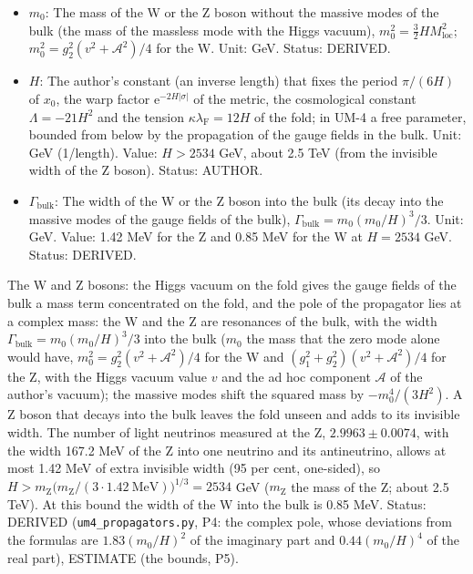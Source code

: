 \documentclass[
  10pt,
]{article}
\begin{document}
\begin{itemize}
  mass. Unit: GeV. Status: STANDARD.
\item
  \(m_0\): The mass of the W or the Z boson without the massive modes of
  the bulk (the mass of the massless mode with the Higgs vacuum),
  \(m_0^2 = \frac32HM_{\mathrm{loc}}^2\);
  \(m_0^2 = g_2^2(v^2 + \mathcal{A}^2)/4\) for the W. Unit: GeV. Status:
  DERIVED.
\item
  \(H\): The author's constant (an inverse length) that fixes the period
  \(\pi/(6H)\) of \(x_0\), the warp factor
  \(\mathrm{e}^{-2H\lvert\sigma\rvert}\) of the metric, the cosmological
  constant \(\Lambda = -21H^2\) and the tension
  \(\kappa\lambda_{\mathrm{F}} = 12H\) of the fold; in UM-4 a free
  parameter, bounded from below by the propagation of the gauge fields
  in the bulk. Unit: GeV (1/length). Value: \(H > 2534\) GeV, about 2.5
  TeV (from the invisible width of the Z boson). Status: AUTHOR.
\item
  \(\Gamma_{\mathrm{bulk}}\): The width of the W or the Z boson into the
  bulk (its decay into the massive modes of the gauge fields of the
  bulk), \(\Gamma_{\mathrm{bulk}} = m_0(m_0/H)^3/3\). Unit: GeV. Value:
  1.42 MeV for the Z and 0.85 MeV for the W at \(H = 2534\) GeV. Status:
  DERIVED.
\end{itemize}

The W and Z bosons: the Higgs vacuum on the fold gives the gauge fields
of the bulk a mass term concentrated on the fold, and the pole of the
propagator lies at a complex mass: the W and the Z are resonances of the
bulk, with the width \(\Gamma_{\mathrm{bulk}} = m_0(m_0/H)^3/3\) into
the bulk (\(m_0\) the mass that the zero mode alone would have,
\(m_0^2 = g_2^2(v^2 + \mathcal{A}^2)/4\) for the W and
\((g_1^2 + g_2^2)(v^2 + \mathcal{A}^2)/4\) for the Z, with the Higgs
vacuum value \(v\) and the ad hoc component \(\mathcal{A}\) of the
author's vacuum); the massive modes shift the squared mass by
\(-m_0^4/(3H^2)\). A Z boson that decays into the bulk leaves the fold
unseen and adds to its invisible width. The number of light neutrinos
measured at the Z, \(2.9963 \pm 0.0074\), with the width 167.2 MeV of
the Z into one neutrino and its antineutrino, allows at most 1.42 MeV of
extra invisible width (95 per cent, one-sided), so
\(H > m_{\mathrm{Z}}\big(m_{\mathrm{Z}}/(3\cdot1.42\ \mathrm{MeV})\big)^{1/3} = 2534\)
GeV (\(m_{\mathrm{Z}}\) the mass of the Z; about 2.5 TeV). At this bound
the width of the W into the bulk is 0.85 MeV. Status: DERIVED
(\texttt{um4\_propagators.py}, P4: the complex pole, whose deviations
from the formulas are \(1.83(m_0/H)^2\) of the imaginary part and
\(0.44(m_0/H)^4\) of the real part), ESTIMATE (the bounds, P5).
\end{document}
